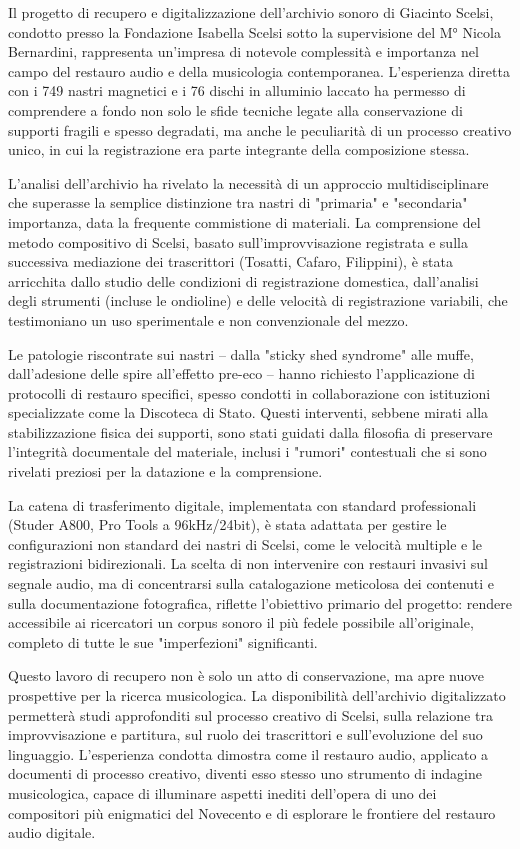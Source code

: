 Il progetto di recupero e digitalizzazione dell'archivio sonoro di Giacinto Scelsi, condotto presso la Fondazione Isabella Scelsi sotto la supervisione del M° Nicola Bernardini, rappresenta un'impresa di notevole complessità e importanza nel campo del restauro audio e della musicologia contemporanea. L'esperienza diretta con i 749 nastri magnetici e i 76 dischi in alluminio laccato ha permesso di comprendere a fondo non solo le sfide tecniche legate alla conservazione di supporti fragili e spesso degradati, ma anche le peculiarità di un processo creativo unico, in cui la registrazione era parte integrante della composizione stessa.

L'analisi dell'archivio ha rivelato la necessità di un approccio multidisciplinare che superasse la semplice distinzione tra nastri di "primaria" e "secondaria" importanza, data la frequente commistione di materiali. La comprensione del metodo compositivo di Scelsi, basato sull'improvvisazione registrata e sulla successiva mediazione dei trascrittori (Tosatti, Cafaro, Filippini), è stata arricchita dallo studio delle condizioni di registrazione domestica, dall'analisi degli strumenti (incluse le ondioline) e delle velocità di registrazione variabili, che testimoniano un uso sperimentale e non convenzionale del mezzo.

Le patologie riscontrate sui nastri – dalla "sticky shed syndrome" alle muffe, dall'adesione delle spire all'effetto pre-eco – hanno richiesto l'applicazione di protocolli di restauro specifici, spesso condotti in collaborazione con istituzioni specializzate come la Discoteca di Stato. Questi interventi, sebbene mirati alla stabilizzazione fisica dei supporti, sono stati guidati dalla filosofia di preservare l'integrità documentale del materiale, inclusi i "rumori" contestuali che si sono rivelati preziosi per la datazione e la comprensione.

La catena di trasferimento digitale, implementata con standard professionali (Studer A800, Pro Tools a 96kHz/24bit), è stata adattata per gestire le configurazioni non standard dei nastri di Scelsi, come le velocità multiple e le registrazioni bidirezionali. La scelta di non intervenire con restauri invasivi sul segnale audio, ma di concentrarsi sulla catalogazione meticolosa dei contenuti e sulla documentazione fotografica, riflette l'obiettivo primario del progetto: rendere accessibile ai ricercatori un corpus sonoro il più fedele possibile all'originale, completo di tutte le sue "imperfezioni" significanti.

Questo lavoro di recupero non è solo un atto di conservazione, ma apre nuove prospettive per la ricerca musicologica. La disponibilità dell'archivio digitalizzato permetterà studi approfonditi sul processo creativo di Scelsi, sulla relazione tra improvvisazione e partitura, sul ruolo dei trascrittori e sull'evoluzione del suo linguaggio. L'esperienza condotta dimostra come il restauro audio, applicato a documenti di processo creativo, diventi esso stesso uno strumento di indagine musicologica, capace di illuminare aspetti inediti dell'opera di uno dei compositori più enigmatici del Novecento e di esplorare le frontiere del restauro audio digitale.